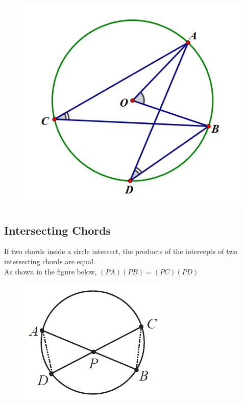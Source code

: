 \documentclass[12pt]{article}
\begin{document}
	\begin{figure}[h!]
		\centering
		\includegraphics[height=0.2\textheight]{Graphics/Week_13/InscribedAngles.png}
	\end{figure}
	\newpage
	
	\subsection{Intersecting Chords}
	If two chords inside a circle intersect, the products of the intercepts of two intersecting chords are equal.\\ As shown in the figure below, $(PA)(PB) = (PC)(PD)$
	\begin{figure}[h!]
		\centering
		\includegraphics[height=0.2\textheight]{Graphics/Week_13/IntersectingChords.png}
	\end{figure}
	
\end{document}

